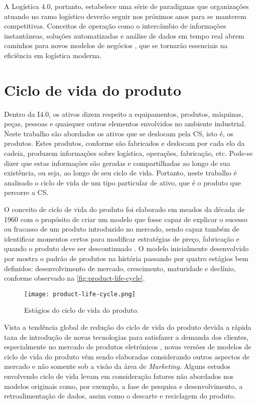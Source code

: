A Logística 4.0, portanto, estabelece uma série de paradigmas que organizações atuando no ramo logístico deverão seguir nos próximos anos para se manterem competitivas. Conceitos de operação como o intercâmbio de informações instantâneas, soluções automatizadas e análise de dados em tempo real abrem caminhos para novos modelos de negócios \cite{strandhagen2017logistics}, que se tornarão essenciais na eficiência em logística moderna.

\section{Ciclo de vida do produto}
\label{sec:ciclo-de-vida}

Dentro da I4.0, os ativos dizem respeito a equipamentos, produtos, máquinas, peças, pessoas e quaisquer outros elementos envolvidos no ambiente industrial. Neste trabalho são abordados os ativos que se deslocam pela CS, isto é, os produtos. Estes produtos, conforme são fabricados e deslocam por cada elo da cadeia, produzem informações sobre logística, operações, fabricação, etc. Pode-se dizer que estas informações são geradas e compartilhadas ao longo de sua existência, ou seja, ao longo de seu ciclo de vida. Portanto, neste trabalho é analisado o ciclo de vida de um tipo particular de ativo, que é o produto que percorre a CS.

O conceito de ciclo de vida do produto foi elaborado em meados da década de 1960 com o propósito de criar um modelo que fosse capaz de explicar o sucesso ou fracasso de um produto introduzido no mercado, sendo capaz também de identificar momentos certos para modificar estratégias de preço, fabricação e quando o produto deve ser descontinuado \cite{cao2012lifecycle}. O modelo inicialmente desenvolvido por  mostra o padrão de produtos na história passando por quatro estágios bem definidos: desenvolvimento de mercado, crescimento, maturidade e declínio, conforme observado na \autoref{fig:product-life-cycle}.

\begin{figure}[htb]
	\centering
	\texttt{[image: product-life-cycle.png]}
	\caption{Estágios do ciclo de vida do produto.}
	\label{fig:product-life-cycle}
\end{figure}

Vista a tendência global de redução do ciclo de vida do produto devida a rápida taxa de introdução de novas tecnologias para satisfazer a demanda dos clientes, especialmente no mercado de produtos eletrônicos \cite{trappey2008lifecycle}, novas versões de modelos de ciclo de vida do produto vêm sendo elaboradas considerando outros aspectos de mercado e não somente sob a visão da área de \textit{Marketing}. Alguns estudos \cite{cao2012lifecycle} envolvendo ciclo de vida levam em consideração fatores não abordados nos modelos originais como, por exemplo, a fase de pesquisa e desenvolvimento, a retroalimentação de dados, assim como o descarte e reciclagem do produto.

